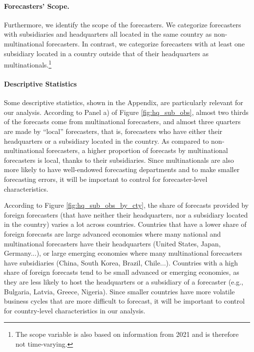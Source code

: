 \paragraph{Forecasters' Scope.} Furthermore, we identify the scope of the forecasters. We categorize forecasters with subsidiaries and headquarters all located in the same country as non-multinational forecasters. In contrast, we categorize forecasters with at least one subsidiary located in a country outside that of their headquarters as multinationals.\footnote{The scope variable is also based on information from 2021 and is therefore not time-varying.}

\paragraph{Descriptive Statistics} Some descriptive statistics, shown in the Appendix, are particularly relevant for our analysis. According to Panel a) of Figure \ref{fig:hq_sub_obs}, almost two thirds of the forecasts come from multinational forecasters, and almost three quarters are made by ``local'' forecasters, that is, forecasters who have either their headquarters or a subsidiary located in the country. As compared to non-multinational forecasters, a higher proportion of forecasts by multinational forecasters is local, thanks to their subsidiaries. Since multinationals are also more likely to have well-endowed forecasting departments and to make smaller forecasting errors, it will be important to control for forecaster-level characteristics.

According to Figure \ref{fig:hq_sub_obs_by_cty}, the share of forecasts provided by foreign forecasters (that have neither their headquarters, nor a subsidiary located in the country) varies a lot across countries. Countries that have a lower share of foreign forecasts are large advanced economies where many national and multinational forecasters have their headquarters (United States, Japan, Germany...), or large emerging economies where many multinational forecasters have subsidiaries (China, South Korea, Brazil, Chile...). Countries with a high share of foreign forecasts tend to be small advanced or emerging economies, as they are less likely to host the headquarters or a subsidiary of a forecaster (e.g., Bulgaria, Latvia, Greece, Nigeria). Since smaller countries have more volatile business cycles that are more difficult to forecast, it will be important to control for country-level characteristics in our analysis.

